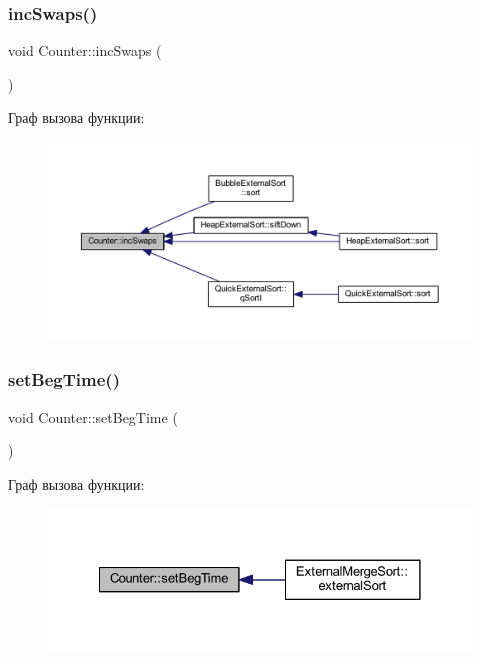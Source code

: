\subsubsection{\texorpdfstring{inc\+Swaps()}{incSwaps()}}
{\footnotesize\ttfamily void Counter\+::inc\+Swaps (\begin{DoxyParamCaption}{ }\end{DoxyParamCaption})}

Граф вызова функции\+:\nopagebreak
\begin{figure}[H]
\begin{center}
\leavevmode
\includegraphics[width=350pt]{class_counter_aa0cd30379394257e44aa7afc84ed1fce_icgraph}
\end{center}
\end{figure}
\hypertarget{class_counter_a71dea1262b81493aa9734f62a72b2691}{}\label{class_counter_a71dea1262b81493aa9734f62a72b2691} 
\subsubsection{\texorpdfstring{set\+Beg\+Time()}{setBegTime()}}
{\footnotesize\ttfamily void Counter\+::set\+Beg\+Time (\begin{DoxyParamCaption}{ }\end{DoxyParamCaption})}

Граф вызова функции\+:\nopagebreak
\begin{figure}[H]
\begin{center}
\leavevmode
\includegraphics[width=328pt]{class_counter_a71dea1262b81493aa9734f62a72b2691_icgraph}
\end{center}
\end{figure}
\hypertarget{class_counter_a338ac4f04d6f5924aa7ace3b14d9ffb9}{}\label{class_counter_a338ac4f04d6f5924aa7ace3b14d9ffb9} 
